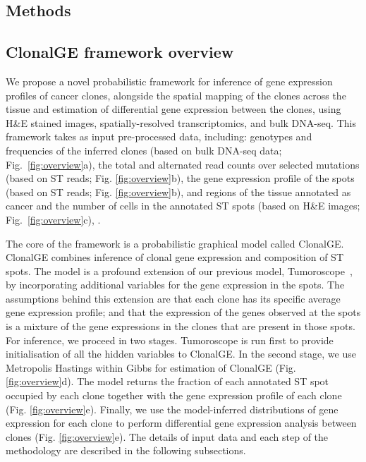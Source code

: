 \documentclass[unnumsec,webpdf,contemporary,large]{oup-authoring-template}%
\theoremstyle{thmstyleone}%
\theoremstyle{thmstyletwo}%
\theoremstyle{thmstylethree}%
\begin{document}
\begin{methods}
\section{Methods}
\subsection*{ClonalGE framework overview}

We propose a novel probabilistic framework for inference of gene expression profiles of cancer clones, alongside the spatial mapping of the clones across the tissue and estimation of differential gene expression between the clones, using H\&E stained images, spatially-resolved transcriptomics, and bulk DNA-seq. This framework takes as input  pre-processed data, including: genotypes and frequencies of the inferred clones (based on bulk DNA-seq data; Fig.~\ref{fig:overview}a),  the total and alternated read counts over selected mutations (based on ST reads; Fig. \ref{fig:overview}b), the gene expression profile of the spots (based on ST reads; Fig. \ref{fig:overview}b), and regions of the tissue annotated as cancer and the number of cells in the annotated ST spots (based on H\&E images; Fig.~\ref{fig:overview}c), . 

The core of the framework is a probabilistic graphical model called ClonalGE. ClonalGE combines inference of clonal gene expression and composition of ST spots. The model is a profound extension of our previous model, Tumoroscope~\citep{shafighi2024integrative}, by incorporating additional variables for the gene expression in the spots. The assumptions behind this extension are that each clone has its specific average gene expression profile; and that the expression of the genes observed at the spots is a mixture of the gene expressions in the clones that are present in those spots. For inference, we proceed in two stages. Tumoroscope is run first to provide initialisation of all the hidden variables to ClonalGE. In the second stage, we use Metropolis Hastings within Gibbs for estimation of ClonalGE (Fig. \ref{fig:overview}d). The model returns the fraction of each annotated ST spot occupied by each clone together with the gene expression profile of each clone (Fig. \ref{fig:overview}e). Finally, we use the model-inferred distributions of gene expression for each clone to perform differential gene expression analysis between clones (Fig. \ref{fig:overview}e). The details of input data and each step of the methodology are described in the following subsections.



\end{methods}
\end{document}
